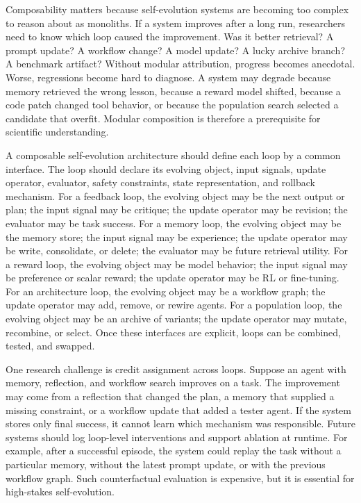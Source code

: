 Composability matters because self-evolution systems are becoming too complex to reason about as monoliths. If a system improves after a long run, researchers need to know which loop caused the improvement. Was it better retrieval? A prompt update? A workflow change? A model update? A lucky archive branch? A benchmark artifact? Without modular attribution, progress becomes anecdotal. Worse, regressions become hard to diagnose. A system may degrade because memory retrieved the wrong lesson, because a reward model shifted, because a code patch changed tool behavior, or because the population search selected a candidate that overfit. Modular composition is therefore a prerequisite for scientific understanding.

A composable self-evolution architecture should define each loop by a common interface. The loop should declare its evolving object, input signals, update operator, evaluator, safety constraints, state representation, and rollback mechanism. For a feedback loop, the evolving object may be the next output or plan; the input signal may be critique; the update operator may be revision; the evaluator may be task success. For a memory loop, the evolving object may be the memory store; the input signal may be experience; the update operator may be write, consolidate, or delete; the evaluator may be future retrieval utility. For a reward loop, the evolving object may be model behavior; the input signal may be preference or scalar reward; the update operator may be RL or fine-tuning. For an architecture loop, the evolving object may be a workflow graph; the update operator may add, remove, or rewire agents. For a population loop, the evolving object may be an archive of variants; the update operator may mutate, recombine, or select. Once these interfaces are explicit, loops can be combined, tested, and swapped.

One research challenge is credit assignment across loops. Suppose an agent with memory, reflection, and workflow search improves on a task. The improvement may come from a reflection that changed the plan, a memory that supplied a missing constraint, or a workflow update that added a tester agent. If the system stores only final success, it cannot learn which mechanism was responsible. Future systems should log loop-level interventions and support ablation at runtime. For example, after a successful episode, the system could replay the task without a particular memory, without the latest prompt update, or with the previous workflow graph. Such counterfactual evaluation is expensive, but it is essential for high-stakes self-evolution.

